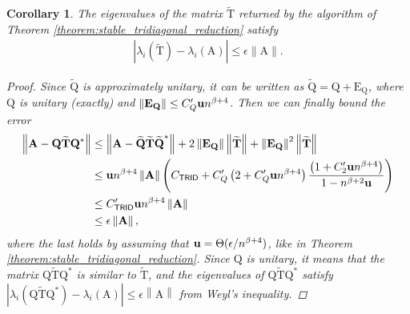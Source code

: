 \documentclass{article}
\newcommand{\labs}{\left|}
\newcommand{\rabs}{\right|}
\newcommand{\lnorm}{\left\|}
\newcommand{\rnorm}{\right\|}
\newcommand{\lpar}{\left(}
\newcommand{\rpar}{\right)}
\newtheorem{corollary}{Corollary}[section]
\newcommand\matA{\boldsymbol{\mathrm{A}}}
\newcommand\matE{\boldsymbol{\mathrm{E}}}
\newcommand\matQ{\boldsymbol{\mathrm{Q}}}
\newcommand\matQtilde{\widetilde{\boldsymbol{\mathrm{Q}}}}
\newcommand\matTtilde{\widetilde{\boldsymbol{\mathrm{T}}}}
\newcommand{\umach}{\textbf{\textup{u}}}
\newcommand{\TRID}{\mathsf{TRID}}
\newcommand{\cmm}{\beta}
\begin{document}
\begin{corollary}
    \label{corollary:tridiagonal_reduction_eigenvalues}
    The eigenvalues of the matrix $\matTtilde$ returned by the algorithm of Theorem \ref{theorem:stable_tridiagonal_reduction} satisfy
    \begin{align*}
        \labs \lambda_i(\matTtilde)-\lambda_i(\matA) \rabs \leq \epsilon \|\matA\|.
    \end{align*}
    \begin{proof}
        Since $\matQtilde$ is approximately unitary, it can be written as $\matQtilde = \matQ+\matE_{\matQ}$, where $\matQ$ is unitary (exactly) and $\|\matE_{\matQ}\|\leq C_Q'\umach n^{\beta+4}$. Then we can finally bound the error
        \begin{align*}
            \lnorm \matA - \matQ\matTtilde\matQ^* \rnorm
            &\leq \lnorm \matA - \matQtilde\matTtilde\matQtilde^*\rnorm
            + 2 \lnorm \matE_{\matQ} \rnorm \lnorm \matTtilde \rnorm 
            +
            \lnorm \matE_{\matQ} \rnorm^2
            \lnorm
            \matTtilde
            \rnorm
            \\
            &\leq
            \umach n^{\cmm+4}
            \lnorm\matA\rnorm
            \lpar
                C_{\TRID}
                +
                C_Q'
                \lpar 
                    2
                    +
                    C_Q'\umach n^{\cmm+4}
                \rpar
                \frac{\lpar
                    1 + C_2'\umach n^{\cmm+4}
                \rpar}{1-n^{\cmm+2}\umach}
            \rpar
            \\
            &\leq
            C_{\TRID}' \umach n^{\cmm+4}
            \lnorm\matA\rnorm
            \\
            &\leq \epsilon \lnorm \matA \rnorm,
        \end{align*}
        where the last holds by assuming that $\umach=\Theta(\epsilon/n^{\cmm+4})$, like in Theorem \ref{theorem:stable_tridiagonal_reduction}. Since $\matQ$ is unitary, it means that the matrix $\matQ\matTtilde\matQ^*$ is similar to $\matTtilde$, and the eigenvalues of $\matQ\matTtilde\matQ^*$ satisfy $\labs \lambda_i(\matQ\matTtilde\matQ^*) - \lambda_i(\matA)\rabs \leq \epsilon \lnorm \matA\rnorm$ from Weyl's inequality.
    \end{proof}
\end{corollary}
\end{document}
